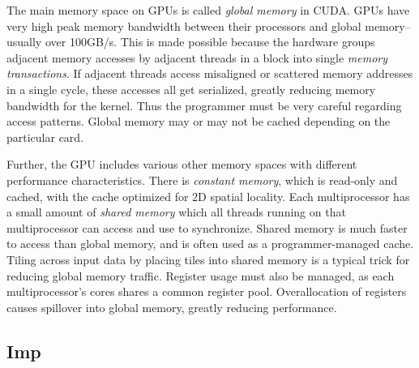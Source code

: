 \documentclass[preprint]{sigplanconf}
\begin{document}
The main memory space on GPUs is called \emph{global memory} in CUDA.  GPUs have
very high peak memory bandwidth between their processors and global
memory--usually over 100GB/s. This is made possible because the hardware groups
adjacent memory accesses by adjacent threads in a block into single \emph{memory
transactions}. If adjacent threads access misaligned or scattered memory
addresses in a single cycle, these accesses all get serialized, greatly reducing
memory bandwidth for the kernel. Thus the programmer must be very careful
regarding access patterns.  Global memory may or may not be cached depending on
the particular card.

Further, the GPU includes various other memory spaces with different
performance characteristics.  There is \emph{constant memory}, which is
read-only and cached, with the cache optimized for 2D spatial locality.  Each
multiprocessor has a small amount of \emph{shared memory} which all threads
running on that multiprocessor can access and use to synchronize.  Shared
memory is much faster to access than global memory, and is often used as a
programmer-managed cache.  Tiling across input data by placing tiles into
shared memory is a typical trick for reducing global memory traffic.  Register
usage must also be managed, as each multiprocessor's cores shares a common
register pool.  Overallocation of registers causes spillover into global
memory, greatly reducing performance.

%

\subsection{Imp}
\label{Imp}
\end{document}
